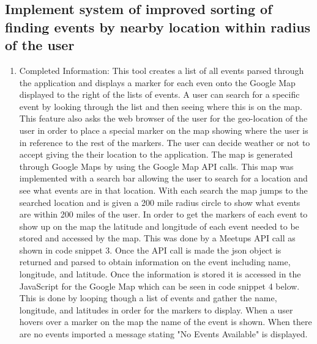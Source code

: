 \documentclass[draftclsnofoot,10pt,onecolumn]{IEEEtran} %
\begin{document}
\subsection{Implement system of improved sorting of finding events by nearby location within radius of the user}
\begin{enumerate}[label*=\arabic*.]
  \item Completed Information: This tool creates a list of all events parsed through 
    the application and displays a marker for each even onto the Google Map displayed
    to the right of the lists of events. A user can search for a specific event by looking
    through the list and then seeing where this is on the map. This feature also asks the 
    web browser of the user for the geo-location of the user in order to place a special
    marker on the map showing where the user is in reference to the rest of the markers. The
    user can decide weather or not to accept giving the their location to the application. The map
    is generated through Google Maps by using the Google Map API calls. This map was implemented 
    with a search bar allowing the user to search for a location and see what events are in 
    that location. With each search the map jumps to the searched location and is given a 200 mile radius
    circle to show what events are within 200 miles of the user. In order to get the markers of
    each event to show up on the map the latitude and longitude of each event needed to be stored and
    accessed by the map. This was done by a Meetups API call as shown in code snippet 3. Once the API call
    is made the json object is returned and parsed to obtain information on the event including name,
    longitude, and latitude. Once the information is stored it is accessed in the JavaScript for the 
    Google Map which can be seen in code snippet 4 below. This is done by looping though a list of 
    events and gather the name, longitude, and
    latitudes in order for the markers to display. When a user hovers over a marker on the map the name of
    the event is shown.  When there are no events imported a message stating 
    "No Events Available" is displayed.

\end{enumerate}

\newpage
\end{document}
